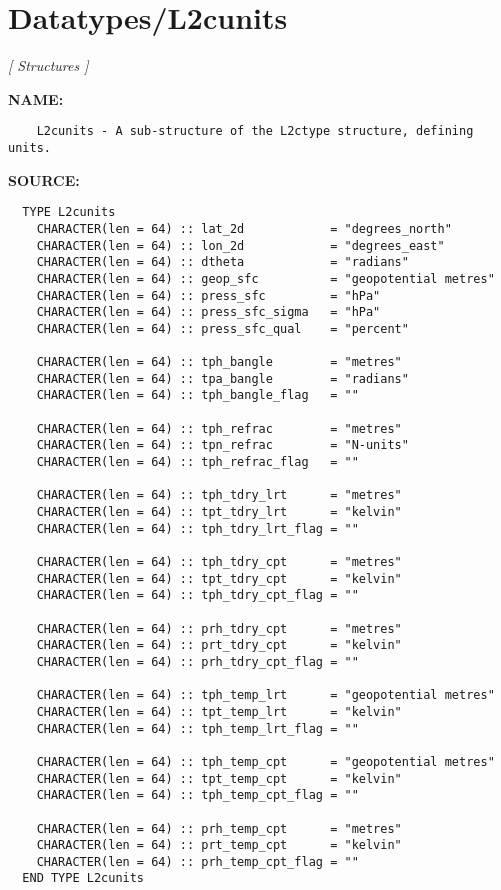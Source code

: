 \section{Datatypes/L2cunits}
\textsl{[ Structures ]}

\label{ch:robo47}
\label{ch:Datatypes_L2cunits}
\textbf{NAME:}\hspace{0.08in}\begin{Verbatim}
    L2cunits - A sub-structure of the L2ctype structure, defining units.
\end{Verbatim}
\textbf{SOURCE:}\hspace{0.08in}\begin{Verbatim}
  TYPE L2cunits
    CHARACTER(len = 64) :: lat_2d            = "degrees_north"
    CHARACTER(len = 64) :: lon_2d            = "degrees_east"
    CHARACTER(len = 64) :: dtheta            = "radians"
    CHARACTER(len = 64) :: geop_sfc          = "geopotential metres"
    CHARACTER(len = 64) :: press_sfc         = "hPa"
    CHARACTER(len = 64) :: press_sfc_sigma   = "hPa"
    CHARACTER(len = 64) :: press_sfc_qual    = "percent"

    CHARACTER(len = 64) :: tph_bangle        = "metres"
    CHARACTER(len = 64) :: tpa_bangle        = "radians"
    CHARACTER(len = 64) :: tph_bangle_flag   = ""

    CHARACTER(len = 64) :: tph_refrac        = "metres"
    CHARACTER(len = 64) :: tpn_refrac        = "N-units"
    CHARACTER(len = 64) :: tph_refrac_flag   = ""

    CHARACTER(len = 64) :: tph_tdry_lrt      = "metres"
    CHARACTER(len = 64) :: tpt_tdry_lrt      = "kelvin"
    CHARACTER(len = 64) :: tph_tdry_lrt_flag = ""

    CHARACTER(len = 64) :: tph_tdry_cpt      = "metres"
    CHARACTER(len = 64) :: tpt_tdry_cpt      = "kelvin"
    CHARACTER(len = 64) :: tph_tdry_cpt_flag = ""

    CHARACTER(len = 64) :: prh_tdry_cpt      = "metres"
    CHARACTER(len = 64) :: prt_tdry_cpt      = "kelvin"
    CHARACTER(len = 64) :: prh_tdry_cpt_flag = ""

    CHARACTER(len = 64) :: tph_temp_lrt      = "geopotential metres"
    CHARACTER(len = 64) :: tpt_temp_lrt      = "kelvin"
    CHARACTER(len = 64) :: tph_temp_lrt_flag = ""

    CHARACTER(len = 64) :: tph_temp_cpt      = "geopotential metres"
    CHARACTER(len = 64) :: tpt_temp_cpt      = "kelvin"
    CHARACTER(len = 64) :: tph_temp_cpt_flag = ""

    CHARACTER(len = 64) :: prh_temp_cpt      = "metres"
    CHARACTER(len = 64) :: prt_temp_cpt      = "kelvin"
    CHARACTER(len = 64) :: prh_temp_cpt_flag = ""
  END TYPE L2cunits
\end{Verbatim}
